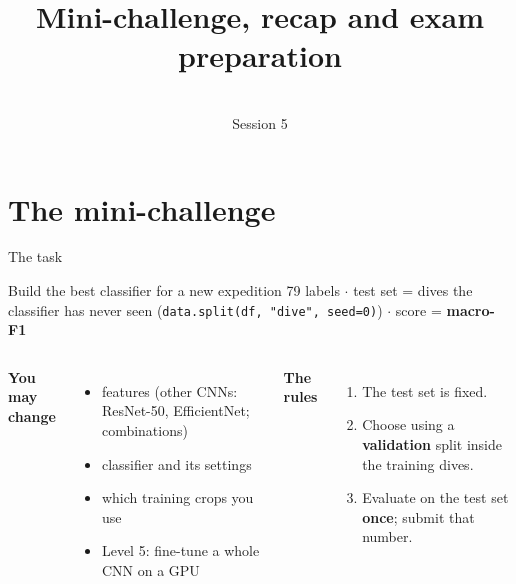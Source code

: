 \documentclass[aspectratio=169,11pt]{beamer}
\title{Mini-challenge, recap and exam preparation}
\subtitle{\coursetitle\\[2pt]\small Session 5}
\date{}
\author{}
\begin{document}
\maketitle

\section{The mini-challenge}

\begin{frame}{The task}
\begin{block}{Build the best classifier for a new expedition}
79 labels $\cdot$ test set = dives the classifier has never seen (\texttt{data.split(df, "dive", seed=0)}) $\cdot$ score = \textbf{macro-F1}
\end{block}
\begin{columns}[T]
\textbf{You may change}
\begin{itemize}\small
  \item features (other CNNs: ResNet-50, EfficientNet; combinations)
  \item classifier and its settings
  \item which training crops you use
  \item Level 5: fine-tune a whole CNN on a GPU
\end{itemize}
\textbf{The rules}
\begin{enumerate}\small
  \item The test set is fixed.
  \item Choose using a \textbf{validation} split inside the training dives.
  \item Evaluate on the test set \textbf{once}; submit that number.
\end{enumerate}
\end{columns}
\vspace{4pt}
\end{frame}
\end{document}
